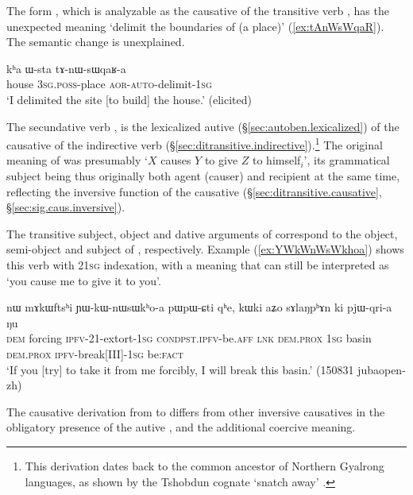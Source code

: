 The form , which is analyzable as the causative of the transitive verb , has the unexpected meaning `delimit the boundaries of (a place)' (\ref{ex:tAnWsWqaR}). The semantic change is unexplained.

\begin{exe} 
\ex \label{ex:tAnWsWqaR}
\gll  kʰa ɯ-sta tɤ-nɯ-sɯqaʁ-a \\
house \textsc{3sg}.\textsc{poss}-place \textsc{aor}-\textsc{auto}-delimit-\textsc{1sg} \\
\glt `I delimited the site [to build] the house.' (elicited)
\end{exe}

The secundative verb , is the lexicalized autive (§\ref{sec:autoben.lexicalized}) of the causative  of the indirective verb  (§\ref{sec:ditransitive.indirective}).\footnote{This derivation dates back to the common ancestor of Northern Gyalrong languages, as shown by the Tshobdun cognate  `snatch away' \citep[220]{jackson19tshobdun}. } The original meaning of  was presumably `$X$ causes $Y$ to give $Z$ to himself$_i$', its grammatical subject being thus originally both agent (causer) and recipient at the same time, reflecting the inversive function of the causative (§\ref{sec:ditransitive.causative}, §\ref{sec:sig.caus.inversive}).

The transitive subject, object and dative arguments of  correspond to the object, semi-object and subject of , respectively. Example (\ref{ex:YWkWnWsWkhoa}) shows this verb with 2\fl{}\textsc{1sg} indexation, with a meaning that can still be interpreted as `you cause me to give it to you'.

\begin{exe}
\ex \label{ex:YWkWnWsWkhoa}
\gll  nɯ mɤkɯftsʰi ɲɯ-kɯ-nɯsɯkʰo-a pɯ\redp{}pɯ-ɕti qʰe, kɯki aʑo sɤlaŋpʰɤn ki pjɯ-qri-a ŋu \\
\textsc{dem} forcing \textsc{ipfv}-2\fl{}1-extort-\textsc{1sg} \textsc{cond}\redp{}\textsc{pst}.\textsc{ipfv}-be.\textsc{aff} \textsc{lnk} \textsc{dem}.\textsc{prox} \textsc{1sg} basin \textsc{dem}.\textsc{prox} \textsc{ipfv}-break[III]-\textsc{1sg} be:\textsc{fact} \\
\glt `If you [try] to take it from me forcibly, I will break this basin.' (150831 jubaopen-zh)
\end{exe}

The causative derivation from  to  differs from other inversive causatives in the obligatory presence of the autive , and the additional coercive meaning.

